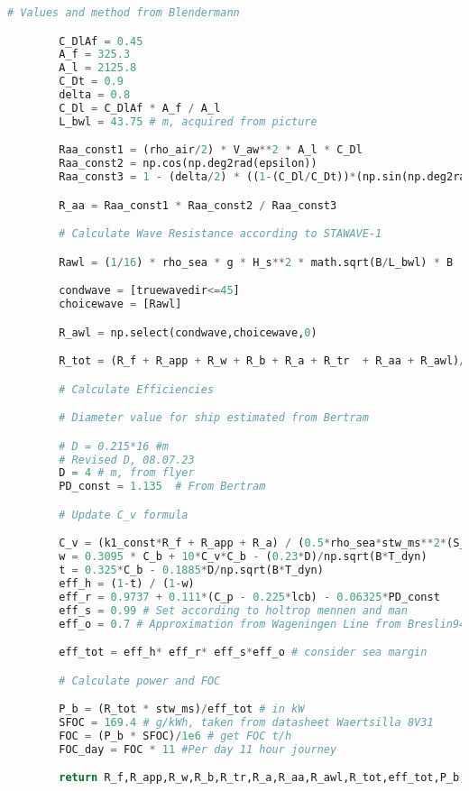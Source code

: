 \begin{lstlisting}[language=Python]
        # Values and method from Blendermann

        C_DlAf = 0.45
        A_f = 325.3
        A_l = 2125.8
        C_Dt = 0.9
        delta = 0.8
        C_Dl = C_DlAf * A_f / A_l
        L_bwl = 43.75 # m, acquired from picture

        Raa_const1 = (rho_air/2) * V_aw**2 * A_l * C_Dl
        Raa_const2 = np.cos(np.deg2rad(epsilon))
        Raa_const3 = 1 - (delta/2) * ((1-(C_Dl/C_Dt))*(np.sin(np.deg2rad(2*epsilon)))**2)

        R_aa = Raa_const1 * Raa_const2 / Raa_const3 

        # Calculate Wave Resistance according to STAWAVE-1

        Rawl = (1/16) * rho_sea * g * H_s**2 * math.sqrt(B/L_bwl) * B

        condwave = [truewavedir<=45]
        choicewave = [Rawl]

        R_awl = np.select(condwave,choicewave,0)

        R_tot = (R_f + R_app + R_w + R_b + R_a + R_tr  + R_aa + R_awl)/1e3 

        # Calculate Efficiencies

        # Diameter value for ship estimated from Bertram 

        # D = 0.215*16 #m 
        # Revised D, 08.07.23
        D = 4 # m, from flyer
        PD_const = 1.135  # From Bertram

        # Update C_v formula

        C_v = (k1_const*R_f + R_app + R_a) / (0.5*rho_sea*stw_ms**2*(S_bh+S_app))
        w = 0.3095 * C_b + 10*C_v*C_b - (0.23*D)/np.sqrt(B*T_dyn) 
        t = 0.325*C_b - 0.1885*D/np.sqrt(B*T_dyn)
        eff_h = (1-t) / (1-w)
        eff_r = 0.9737 + 0.111*(C_p - 0.225*lcb) - 0.06325*PD_const
        eff_s = 0.99 # Set according to holtrop mennen and man
        eff_o = 0.7 # Approximation from Wageningen Line from Breslin94, since Holtrop perform their measurement in Wageningen basin 

        eff_tot = eff_h* eff_r* eff_s*eff_o # consider sea margin

        # Calculate power and FOC

        P_b = (R_tot * stw_ms)/eff_tot # in kW
        SFOC = 169.4 # g/kWh, taken from datasheet Waertsilla 8V31
        FOC = (P_b * SFOC)/1e6 # get FOC t/h
        FOC_day = FOC * 11 #Per day 11 hour journey

        return R_f,R_app,R_w,R_b,R_tr,R_a,R_aa,R_awl,R_tot,eff_tot,P_b,FOC
\end{lstlisting}

